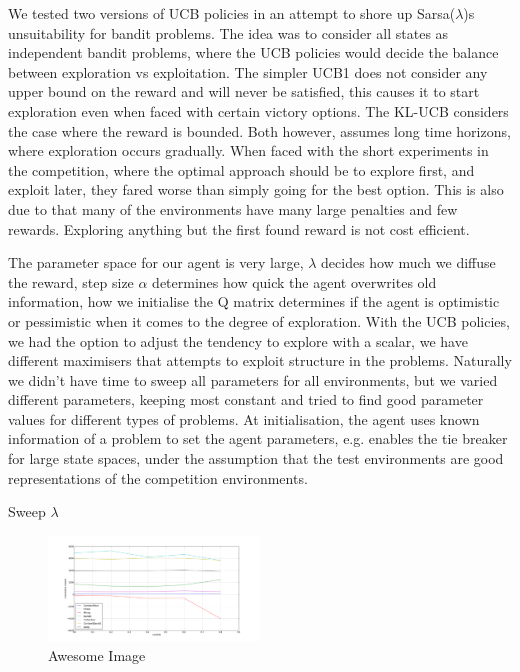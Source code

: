 We tested two versions of UCB policies in an attempt to shore up Sarsa($\lambda$)s unsuitability for bandit problems. The idea was to consider all states as independent bandit problems, where the UCB policies would decide the balance between exploration vs exploitation. The simpler UCB1 does not consider any upper bound on the reward and will never be satisfied, this causes it to start exploration even when faced with certain victory options. The KL-UCB considers the case where the reward is bounded. Both however, assumes long time horizons, where exploration occurs gradually. When faced with the short experiments in the competition, where the optimal approach should be to explore first, and exploit later, they fared worse than simply going for the best option. This is also due to that many of the environments have many large penalties and few rewards. Exploring anything but the first found reward is not cost efficient. 

The parameter space for our agent is very large, $\lambda$ decides how much we diffuse the reward, step size $\alpha$ determines how quick the agent overwrites old information, how we initialise the Q matrix determines if the agent is optimistic or pessimistic when it comes to the degree of exploration. With the UCB policies, we had the option to adjust the tendency to explore with a scalar, we have different maximisers that attempts to exploit structure in the problems. Naturally we didn't have time to sweep all parameters for all environments, but we varied different parameters, keeping most constant and tried to find good parameter values for different types of problems. At initialisation, the agent uses known information of a problem to set the agent parameters, e.g. enables the tie breaker for large state spaces, under the assumption that the test environments are good representations of the competition environments.

Sweep $\lambda$
\begin{figure}[h]
    \centering
    \includegraphics[width=0.5\textwidth]{../data/lambdasweepplot.png}
    \caption{Awesome Image}
    \label{fig:awesome_image}
\end{figure}


